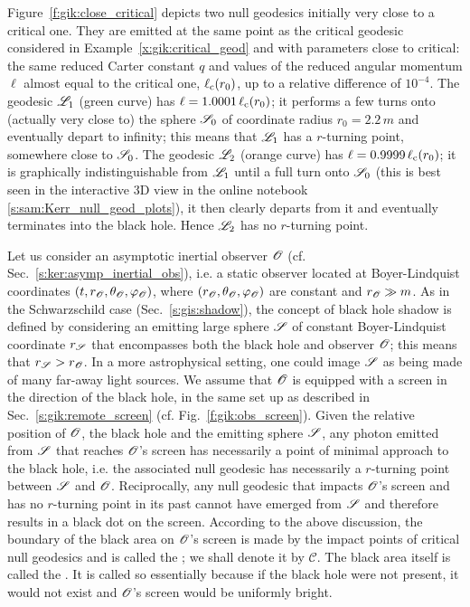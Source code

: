 \begin{example}
Figure~\ref{f:gik:close_critical} depicts
two null geodesics initially very close to a critical one.
They are emitted at the same point as the critical geodesic considered in Example~\ref{x:gik:critical_geod}
and with parameters close to critical: the same reduced Carter constant $q$
and values of the reduced angular momentum $\ell$ almost equal to the critical
one, $\ell_{\rm c}(r_0)$, up to a relative difference of $10^{-4}$.
The geodesic $\mathscr{L}_1$ (green curve) has $\ell = 1.0001\,\ell_{\rm c}(r_0)$; it performs a few
turns onto (actually very close to) the sphere $\mathscr{S}_0$ of coordinate radius $r_0 = 2.2\, m$ and eventually depart to infinity; this means that $\mathscr{L}_1$ has a $r$-turning point, somewhere close
to $\mathscr{S}_0$.
The geodesic $\mathscr{L}_2$ (orange curve) has $\ell = 0.9999\,\ell_{\rm c}(r_0)$; it is
graphically indistinguishable from $\mathscr{L}_1$ until a full turn onto $\mathscr{S}_0$
(this is best seen in the interactive 3D view in the online notebook \ref{s:sam:Kerr_null_geod_plots}),
it then clearly
departs from it and eventually terminates into the black hole. Hence $\mathscr{L}_2$ has no $r$-turning
point.
\end{example}

Let us consider an asymptotic inertial observer $\mathscr{O}$ (cf. Sec.~\ref{s:ker:asymp_inertial_obs}),
i.e. a static observer located at Boyer-Lindquist coordinates $(t,r_{\mathscr{O}},\theta_{\mathscr{O}},\varphi_{\mathscr{O}})$,
where $(r_{\mathscr{O}},\theta_{\mathscr{O}},\varphi_{\mathscr{O}})$ are constant and $r_{\mathscr{O}} \gg m$.
As in the Schwarzschild case (Sec.~\ref{s:gis:shadow}), the concept of
black hole shadow is defined by considering an emitting large sphere $\mathscr{S}$
of constant Boyer-Lindquist coordinate $r_{\mathscr{S}}$ that
encompasses both the black hole and observer $\mathscr{O}$; this means that
$r_{\mathscr{S}} > r_{\mathscr{O}}$. In a more astrophysical setting, one could image $\mathscr{S}$
as being made of many far-away light sources.
We assume that $\mathscr{O}$ is equipped with a screen in the
direction of the black hole, in the same set up as described in Sec.~\ref{s:gik:remote_screen}
(cf. Fig.~\ref{f:gik:obs_screen}). Given the relative position of $\mathscr{O}$, the black hole
and the emitting sphere $\mathscr{S}$, any photon emitted from $\mathscr{S}$ that reaches $\mathscr{O}$'s screen
has necessarily a point of minimal approach to the black hole, i.e. the associated
null geodesic has necessarily a $r$-turning point between $\mathscr{S}$ and $\mathscr{O}$.
Reciprocally, any null geodesic that impacts $\mathscr{O}$'s screen and has no
$r$-turning point in its past cannot have emerged from $\mathscr{S}$ and therefore
results in a black dot on the screen. According to the above discussion, the
boundary of the black area on $\mathscr{O}$'s screen is made by the impact points of
critical null geodesics and is called the 
\cite{GrallHW19,GrallL20a}; we shall denote it by $\mathscr{C}$.
The black area itself is called the
.
It is called so essentially because if the black hole were not present, it would
not exist and $\mathscr{O}$'s screen would be uniformly bright.

